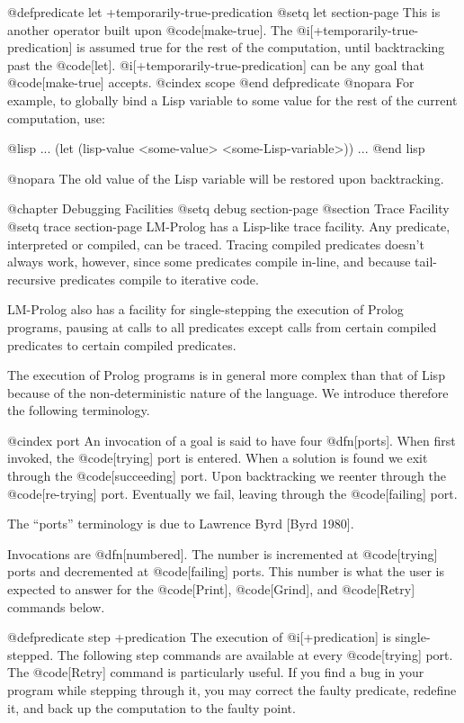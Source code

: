 {@defpredicate let +temporarily-true-predication
@setq let section-page
This is another operator built upon @code[make-true].
The @i[+temporarily-true-predication] is assumed true for the rest
of the computation, until backtracking past the @code[let].
@i[+temporarily-true-predication] can be any goal that
@code[make-true] accepts.
@cindex scope
@end defpredicate
@nopara
For example, to globally bind a Lisp variable to some value
for the rest of the current computation, use:

@lisp
  ...
  (let (lisp-value <some-value> <some-Lisp-variable>))
  ...
@end lisp

@nopara 
The old value of the Lisp variable will be restored upon backtracking.

@chapter Debugging Facilities
@setq debug section-page
@section Trace Facility
@setq trace section-page
LM-Prolog has a Lisp-like trace facility.  Any predicate, interpreted or
compiled, can be traced.  Tracing compiled predicates doesn't always
work, however, since some predicates compile in-line, and because 
tail-recursive predicates compile to iterative code.  

LM-Prolog also has a facility for single-stepping the execution of Prolog 
programs, pausing at calls to all predicates except calls from
certain compiled predicates to certain compiled predicates.

The execution of Prolog programs is in general more complex than that
of Lisp because of the non-deterministic nature of the language.  We
introduce therefore the following terminology.

@cindex port
An invocation of a goal is said to have four @dfn[ports]. When first
invoked, the @code[trying] port is entered. When a solution is found we exit
through the @code[succeeding] port. Upon backtracking we reenter through the 
@code[re-trying] port.  Eventually we fail, leaving through the @code[failing] port.

The ``ports'' terminology is due to Lawrence Byrd [Byrd 1980].

Invocations are @dfn[numbered].  The number is incremented at
@code[trying] ports and decremented at @code[failing] ports.  This number
is what the user is expected to answer for the @code[Print], @code[Grind], 
and @code[Retry] commands below.  

@defpredicate step +predication 
The execution of @i[+predication] is single-stepped.  The following
step commands are available at every @code[trying] port.  The @code[Retry]
command is particularly useful.  If you find a bug in your program
while stepping through it, you may correct the faulty predicate,
redefine it, and back up the computation to the faulty point.

}
